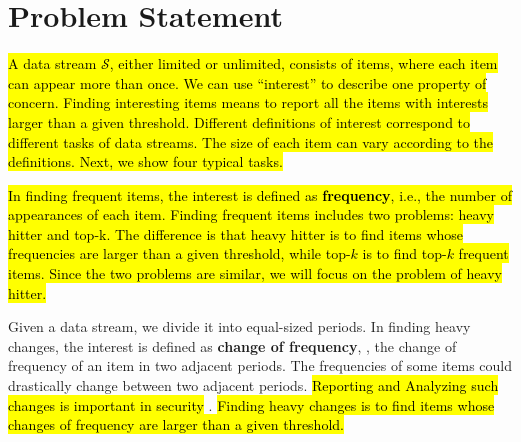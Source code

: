 

\presec
\section{Problem Statement} \vvv

{\color{reviewA}
\hl{A data stream $\mathcal{S}$, either limited or unlimited, consists of items, where each item can appear more than once. We can use ``interest'' to describe one property of concern. Finding interesting items means to report all the items with interests larger than a given threshold.
%
Different definitions of interest correspond to different tasks of data streams. The size of each item can vary according to the definitions. Next, we show four typical tasks.
}}

{\color{reviewA}
\hl{In finding frequent items, the interest is defined as \textbf{frequency}, i.e., the number of appearances of each item. Finding frequent items includes two problems: heavy hitter and top-k. The difference is that heavy hitter is to find items whose frequencies are larger than a given threshold, while top-$k$ is to find top-$k$ frequent items. Since the two problems are similar, we will focus on the problem of heavy hitter.}}

Given a data stream, we divide it into equal-sized periods. 
In finding heavy changes, the interest is defined as \textbf{change of frequency}, \ie, the change of frequency of an item in two adjacent periods.
The frequencies of some items could drastically change between two adjacent periods. \hl{Reporting and Analyzing such changes is important in security} \cite{flowradar,revsketch}. \hl{Finding heavy changes is to find items whose changes of frequency are larger than a given threshold.}


